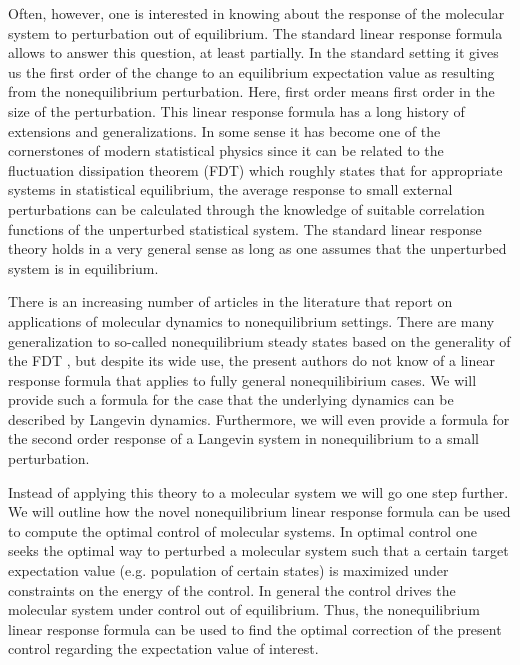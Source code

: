 \documentclass[]{tMPH2e}
\begin{document}
Often, however, one is interested in knowing about the response of the molecular system to perturbation out of equilibrium. The standard linear response formula allows to answer this question, at least partially. In the standard setting it gives us the first order of the change to an equilibrium expectation value as resulting from the nonequilibrium perturbation. Here, first order means first order in the size of the perturbation. This linear response formula has a long history of extensions and generalizations. In some sense it has become one of the cornerstones of modern statistical physics since it can be related to the fluctuation dissipation theorem (FDT) which roughly states that for appropriate systems in statistical equilibrium, the average response to small external perturbations can be calculated through the knowledge of suitable correlation functions of the unperturbed statistical system. The standard linear response theory holds in a  very general sense \cite{HairerMajda} as long as one assumes that the unperturbed system is in equilibrium.

There is an increasing number of articles in the literature that report on applications of molecular dynamics to nonequilibrium settings. There are many generalization to so-called nonequilibrium steady states based on the generality of the FDT \cite{Seifert}, but despite its wide use, the present authors do not know of a linear response formula that applies to fully general nonequilibirium cases. We will provide such a formula for the case that the underlying dynamics can be described by Langevin dynamics. Furthermore, we will even provide a formula for the second order response of a Langevin system in nonequilibrium to a small perturbation.

Instead of applying this theory to a molecular system we will go one step further. We will outline how the novel nonequilibrium linear response formula can be used to compute the optimal control of molecular systems. In optimal control one seeks the optimal way to perturbed a molecular system such that a certain target expectation value (e.g. population of certain states) is maximized under constraints on the energy of the control. In general the control drives the molecular system under control out of equilibrium. Thus, the nonequilibrium linear response formula can be used to find the optimal correction of the present control regarding the expectation value of interest. 
\end{document}
